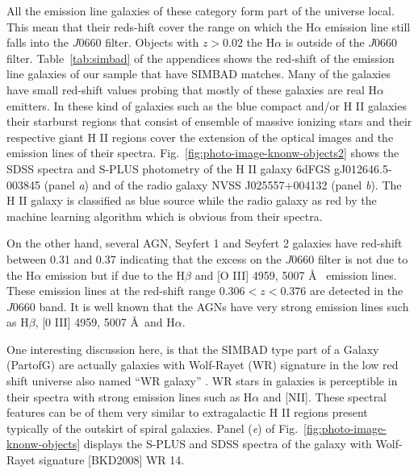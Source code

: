 \documentclass[fleqn,usenatbib]{mnras}
\begin{document}
All the emission line galaxies of these category form part of the universe local.
This mean that their reds-hift cover the range on which the H{$\alpha$} emission line still
falls into the $J0660$ filter. Objects with $ z >  0.02$ the  H{$\alpha$} is outside 
of the $J0660$ filter. Table~\ref{tab:simbad} of the appendices shows the red-shift of the
emission line galaxies of our sample that have SIMBAD matches. Many of the galaxies have 
small red-shift values probing that mostly of these galaxies are real H{$\alpha$} emitters. 
In these kind of galaxies such as the blue 
compact and/or H II galaxies their starburst regions that consist of ensemble of massive 
ionizing stars and their respective giant H II regions cover the extension of the optical 
images and the emission lines of their spectra. Fig.~\ref{fig:photo-image-knonw-objects2}
shows the SDSS spectra and S-PLUS photometry of the H II galaxy 6dFGS gJ012646.5-003845 
(panel \textit{a}) and of the radio galaxy NVSS J025557+004132 (panel \textit{b}). 
The H II galaxy is classified 
as blue source while the radio galaxy as red by the machine learning 
algorithm which is obvious from their spectra. 

On the other hand, several AGN, Seyfert 1 and Seyfert 2 galaxies have red-shift 
between 0.31 and 0.37 indicating that the excess on the $J0660$ filter
is not due to the H{$\alpha$} emission but if due to the H{$\beta$} and [O III] 4959, 5007 \AA~ 
emission lines. These emission lines at the red-shift range $0.306 < z < 0.376$ are detected 
in the $J0660$ band. 
It is well known that the AGNs have very strong emission 
lines such as H{$\beta$}, [0 III] 4959, 5007 \AA~and H{$\alpha$}. 

One interesting discussion here, is that the SIMBAD type part of a Galaxy (PartofG)
 are actually galaxies with Wolf-Rayet (WR) signature in the low red shift
universe also named ``WR galaxy'' \citep{Osterbrock:1982}. WR stars in galaxies
is perceptible in their spectra with strong emission lines such as H{$\alpha$}
and [NII]. These spectral features can be of them very similar to extragalactic
H II regions present typically of the outskirt of spiral galaxies. Panel (\textit{e}) 
of Fig.~\ref{fig:photo-image-knonw-objects} displays the S-PLUS and SDSS spectra 
of the galaxy with Wolf-Rayet signature [BKD2008] WR 14.
\end{document}
